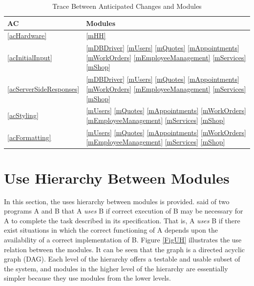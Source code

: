 \documentclass[12pt, titlepage]{article}
\begin{document}
\begin{table}[H]
	\caption{Trace Between Anticipated Changes and Modules} \label{TblACT}
	\centering
	\begin{tabular}{p{} p{}}
		\toprule
		\textbf{AC}                 & \textbf{Modules}                                                                                                                       \\
		\midrule
		\ref{acHardware}            & \ref{mHH}                                                                                                                              \\
		\ref{acInitialInput}        & \ref{mDBDriver} \ref{mUsers} \ref{mQuotes} \ref{mAppointments} \ref{mWorkOrders} \ref{mEmployeeManagement} \ref{mServices} \ref{mShop} \\
		\ref{acServerSideResponses} & \ref{mDBDriver} \ref{mUsers} \ref{mQuotes} \ref{mAppointments} \ref{mWorkOrders} \ref{mEmployeeManagement} \ref{mServices} \ref{mShop} \\
		\ref{acStyling}             & \ref{mUsers} \ref{mQuotes} \ref{mAppointments} \ref{mWorkOrders} \ref{mEmployeeManagement} \ref{mServices} \ref{mShop}                 \\
		\ref{acFormatting}          & \ref{mUsers} \ref{mQuotes} \ref{mAppointments} \ref{mWorkOrders} \ref{mEmployeeManagement} \ref{mServices} \ref{mShop}                 \\
		\bottomrule
	\end{tabular}
\end{table}

\section{Use Hierarchy Between Modules} \label{SecUse}

In this section, the uses hierarchy between modules is provided. \citet{Parnas1978} said of two
programs A and B that A {\em uses} B if correct execution of B may be necessary for A to complete
the task described in its specification. That is, A {\em uses} B if there exist situations in which
the correct functioning of A depends upon the availability of a correct implementation of B. Figure
\ref{FigUH} illustrates the use relation between the modules. It can be seen that the graph is a
directed acyclic graph (DAG). Each level of the hierarchy offers a testable and usable subset of
the system, and modules in the higher level of the hierarchy are essentially simpler because they
use modules from the lower levels.
\end{document}
